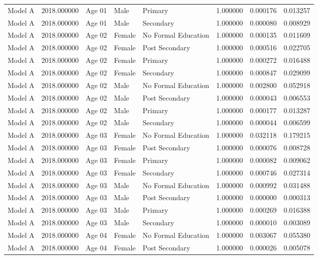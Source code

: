 \begin{table}[ht]
\begin{tabular}{lrlllrrr}
Model A & 2018.000000 & Age 01 & Male & Primary & 1.000000 & 0.000176 & 0.013257 \\
Model A & 2018.000000 & Age 01 & Male & Secondary & 1.000000 & 0.000080 & 0.008929 \\
Model A & 2018.000000 & Age 02 & Female & No Formal Education & 1.000000 & 0.000135 & 0.011609 \\
Model A & 2018.000000 & Age 02 & Female & Post Secondary & 1.000000 & 0.000516 & 0.022705 \\
Model A & 2018.000000 & Age 02 & Female & Primary & 1.000000 & 0.000272 & 0.016488 \\
Model A & 2018.000000 & Age 02 & Female & Secondary & 1.000000 & 0.000847 & 0.029099 \\
Model A & 2018.000000 & Age 02 & Male & No Formal Education & 1.000000 & 0.002800 & 0.052918 \\
Model A & 2018.000000 & Age 02 & Male & Post Secondary & 1.000000 & 0.000043 & 0.006553 \\
Model A & 2018.000000 & Age 02 & Male & Primary & 1.000000 & 0.000177 & 0.013287 \\
Model A & 2018.000000 & Age 02 & Male & Secondary & 1.000000 & 0.000044 & 0.006599 \\
Model A & 2018.000000 & Age 03 & Female & No Formal Education & 1.000000 & 0.032118 & 0.179215 \\
Model A & 2018.000000 & Age 03 & Female & Post Secondary & 1.000000 & 0.000076 & 0.008728 \\
Model A & 2018.000000 & Age 03 & Female & Primary & 1.000000 & 0.000082 & 0.009062 \\
Model A & 2018.000000 & Age 03 & Female & Secondary & 1.000000 & 0.000746 & 0.027314 \\
Model A & 2018.000000 & Age 03 & Male & No Formal Education & 1.000000 & 0.000992 & 0.031488 \\
Model A & 2018.000000 & Age 03 & Male & Post Secondary & 1.000000 & 0.000000 & 0.000313 \\
Model A & 2018.000000 & Age 03 & Male & Primary & 1.000000 & 0.000269 & 0.016388 \\
Model A & 2018.000000 & Age 03 & Male & Secondary & 1.000000 & 0.000010 & 0.003089 \\
Model A & 2018.000000 & Age 04 & Female & No Formal Education & 1.000000 & 0.003067 & 0.055380 \\
Model A & 2018.000000 & Age 04 & Female & Post Secondary & 1.000000 & 0.000026 & 0.005078 \\

\end{tabular}
\end{table}
